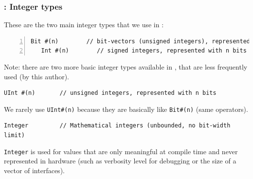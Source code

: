 \begin{frame}[fragile]
\frametitle{{\BSV}: Integer types}

\footnotesize

These are the two main integer types that we use in {\BSV}:

\begin{Verbatim}[frame=single, numbers=left]
   Bit #(n)        // bit-vectors (unsigned integers), represented with n bits
   Int #(n)        // signed integers, represented with n bits
\end{Verbatim}

\PAUSE{\vspace{10ex}}

Note: there are two more basic integer types available in {\BSV}, that
are less frequently used (by this author).

\vspace{2ex}

\begin{Verbatim}[frame=single]
   UInt #(n)       // unsigned integers, represented with n bits
\end{Verbatim}

We rarely use \verb|UInt#(n)| because they are basically like
\verb|Bit#(n)| (same operators).

\vspace{5ex}

\begin{Verbatim}[frame=single]
   Integer         // Mathematical integers (unbounded, no bit-width limit)
\end{Verbatim}

\verb|Integer| is used for values that are only meaningful at compile
time and never represented in hardware (such as verbosity level for
debugging or the size of a vector of interfaces).

\end{frame}


